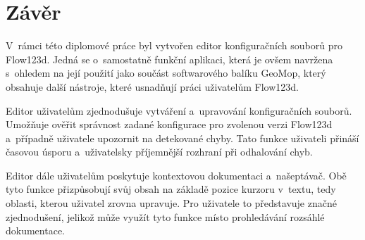 \documentclass[FM,bw,DP]{tulthesis}
\begin{document}
%
%
%
%
%
%
%
%
%
%
%
%
%
%


\chapter*{Závěr}
V~rámci této diplomové práce byl vytvořen editor konfiguračních souborů pro Flow123d. Jedná se o~samostatně funkční aplikaci, která je ovšem navržena s~ohledem na její použití jako součást softwarového balíku GeoMop, který obsahuje další nástroje, které usnadňují práci uživatelům Flow123d.

Editor uživatelům zjednodušuje vytváření a~upravování konfiguračních souborů. Umožňuje ověřit správnost zadané konfigurace pro zvolenou verzi Flow123d a~případně uživatele upozornit na detekované chyby. Tato funkce uživateli přináší časovou úsporu a~uživatelsky příjemnější rozhraní při odhalování chyb.

Editor dále uživatelům poskytuje kontextovou dokumentaci a~našeptávač. Obě tyto funkce přizpůsobují svůj obsah na základě pozice kurzoru v~textu, tedy oblasti, kterou uživatel zrovna upravuje. Pro uživatele to představuje značné zjednodušení, jelikož může využít tyto funkce místo prohledávání rozsáhlé dokumentace.
\end{document}
